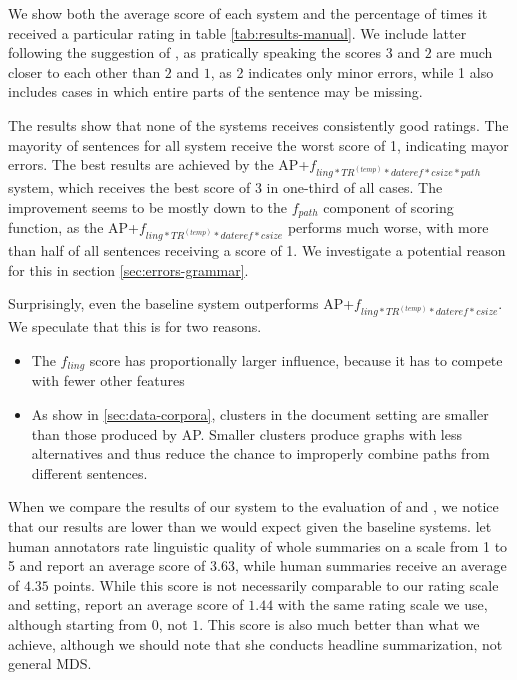 \documentclass[a4paper,BCOR=10mm]{report}
\numberwithin{lemma}{chapter}
\numberwithin{definition}{chapter}
\begin{document}
We show both the average score of each system and the percentage of times it received a particular rating in table \ref{tab:results-manual}.
We include latter following the suggestion of \citet{filippova}, as pratically speaking the scores $3$ and $2$ are much closer to each other than $2$ and $1$, as 2 indicates only minor errors, while 1 also includes cases in which entire parts of the sentence may be missing.

The results show that none of the systems receives consistently good ratings. The mayority of sentences for all system receive the worst score of 1, indicating mayor errors.
The best results are achieved by the AP+$f_{ ling*TR^{(temp)}*\mathit{dateref}*\mathit{csize}*\mathit{path} }$ system, which receives the best score of 3 in one-third of all cases. The improvement seems to be mostly down to the $f_{path}$ component of scoring function, as the AP+$f_{ ling*TR^{(temp)}*\mathit{dateref}*\mathit{csize}}$ performs much worse, with more than half of all sentences receiving a score of 1.
We investigate a potential reason for this in section \ref{sec:errors-grammar}.

Surprisingly, even the baseline system outperforms AP+$f_{ ling*TR^{(temp)}*\mathit{dateref}*\mathit{csize}}$. We speculate that this is for two reasons.

\begin{itemize}
    \item{The $f_{ling}$ score has proportionally larger influence, because it has to compete with fewer other features}
    \item{As show in \ref{sec:data-corpora}, clusters in the document setting are smaller than those produced by AP. Smaller clusters produce graphs with less alternatives and thus reduce the chance to improperly combine paths from different sentences.}
\end{itemize}

When we compare the results of our system to the evaluation of \citet{banerjee} and \citet{filippova}, we notice that our results are lower than we would expect given the baseline systems. \citet{banerjee} let human annotators rate linguistic quality of whole summaries on a scale from 1 to 5 and report an average score of $3.63$, while human summaries receive an average of $4.35$ points.
While this score is not necessarily comparable to our rating scale and setting, \citet{filippova} report an average score of $1.44$ with the same rating scale we use, although starting from $0$, not $1$. This score is also much better than what we achieve, although we should note that she conducts headline summarization, not general MDS.
\end{document}
